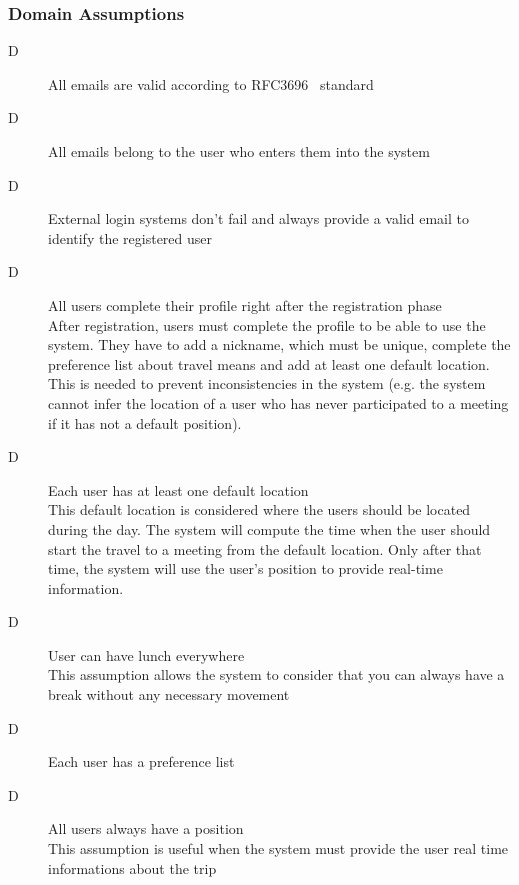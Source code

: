\subsubsection{Domain Assumptions}

\begin{description}

\item[D\thecountDom] All emails are valid according to RFC3696~\cite{RFC3696} standard
\item[D\thecountDom] All emails belong to the user who enters them into the system

\item[D\thecountDom] External login systems don’t fail and always provide a valid email to identify the registered user

\item[D\thecountDom] All users complete their profile right after the registration phase \\ [0.1cm]
After registration, users must complete the profile to be able to use the system. They have to add a nickname, which must be unique, complete the preference list about travel means and add at least one default location. This is needed to prevent inconsistencies in the system (e.g. the system cannot infer the location of a user who has never participated to a meeting if it has not a default position).

\item[D\thecountDom] Each user has at least one default location \\ [0.1cm]
This default location is considered where the users should be located during the day. The system will compute the time when the user should start the travel to a meeting from the default location. Only after that time, the system will use the user's position to provide real-time information.

\item[D\thecountDom]  User can have lunch everywhere \\ [0.1cm]
This assumption allows the system to consider that you can always have a break without any necessary movement

\item[D\thecountDom]  Each user has a preference list

\item[D\thecountDom]  All users always have a position \\ [0.1cm]
This assumption is useful when the system must provide the user real time informations about the trip


\end{description}
